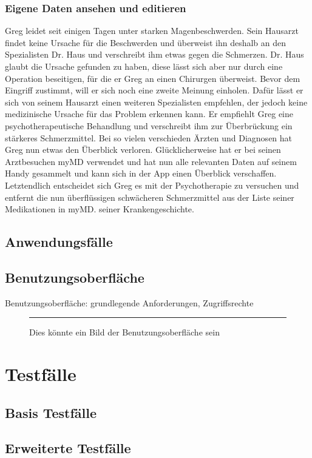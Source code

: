 \documentclass[a4paper]{scrreprt}
\begin{document}
\subsection{Eigene Daten ansehen und editieren}
Greg leidet seit einigen Tagen unter starken Magenbeschwerden. Sein Hausarzt findet keine Ursache für die Beschwerden und überweist ihn deshalb an den Spezialisten Dr. Haus und verschreibt ihm etwas gegen die Schmerzen. Dr. Haus glaubt die Ursache gefunden zu haben, diese lässt sich aber nur durch eine Operation beseitigen, für die er Greg an einen Chirurgen überweist. Bevor dem Eingriff zustimmt, will er sich noch eine zweite Meinung einholen. Dafür lässt er sich von seinem Hausarzt einen weiteren Spezialisten empfehlen, der jedoch keine medizinische Ursache für das Problem erkennen kann. Er empfiehlt Greg eine psychotherapeutische Behandlung und verschreibt ihm zur Überbrückung ein stärkeres Schmerzmittel. Bei so vielen verschieden Ärzten und Diagnosen hat Greg nun etwas den Überblick verloren. Glücklicherweise hat er bei seinen Arztbesuchen myMD verwendet und hat nun alle relevanten Daten auf seinem Handy gesammelt und kann sich in der App einen Überblick verschaffen. Letztendlich entscheidet sich Greg es mit der Psychotherapie zu versuchen und entfernt die nun überflüssigen schwächeren Schmerzmittel aus der Liste seiner Medikationen in myMD. seiner Krankengeschichte.

\section{Anwendungsfälle}
\section{Benutzungsoberfläche}
Benutzungsoberfläche: grundlegende Anforderungen, Zugriffsrechte
 
\begin{figure}[ht]
  \centering
  \rule{8cm}{6cm}
  \caption{Dies könnte ein Bild der Benutzungsoberfläche sein}
\end{figure}

\chapter{Testfälle}
\section{Basis Testfälle}
\section{Erweiterte Testfälle}
\end{document}
